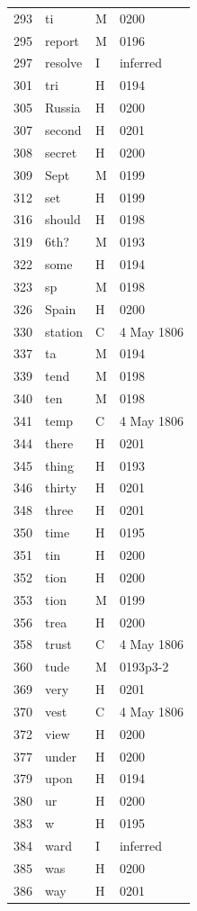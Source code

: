 \begin{longtable}{@{}rlll@{}}
293 & ti & M & 0200 \\
295 & report & M & 0196 \\
297 & resolve & I & inferred \\
301 & tri & H & 0194 \\
305 & Russia & H & 0200 \\
307 & second & H & 0201 \\
308 & secret & H & 0200 \\
309 & Sept & M & 0199 \\
312 & set & H & 0199 \\
316 & should & H & 0198 \\
319 & 6th? & M & 0193 \\
322 & some & H & 0194 \\
323 & sp & M & 0198 \\
326 & Spain & H & 0200 \\
330 & station & C & 4 May 1806 \\
337 & ta & M & 0194 \\
339 & tend & M & 0198 \\
340 & ten & M & 0198 \\
341 & temp & C & 4 May 1806 \\
344 & there & H & 0201 \\
345 & thing & H & 0193 \\
346 & thirty & H & 0201 \\
348 & three & H & 0201 \\
350 & time & H & 0195 \\
351 & tin & H & 0200 \\
352 & tion & H & 0200 \\
353 & tion & M & 0199 \\
356 & trea & H & 0200 \\
358 & trust & C & 4 May 1806 \\
360 & tude & M & 0193p3-2 \\
369 & very & H & 0201 \\
370 & vest & C & 4 May 1806 \\
372 & view & H & 0200 \\
377 & under & H & 0200 \\
379 & upon & H & 0194 \\
380 & ur & H & 0200 \\
383 & w & H & 0195 \\
384 & ward & I & inferred \\
385 & was & H & 0200 \\
386 & way & H & 0201 \\

\end{longtable}
